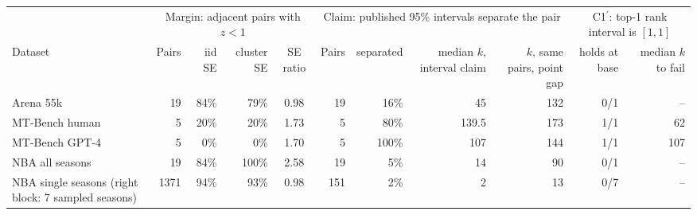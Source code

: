 \begin{tabular}{lrrrcrrrrrr}
\toprule
 & \multicolumn{4}{c}{Margin: adjacent pairs with $z<1$} & \multicolumn{4}{c}{Claim: published 95\% intervals separate the pair} & \multicolumn{2}{c}{C1$^\prime$: top-1 rank interval is $[1,1]$} \\
\cmidrule(lr){2-5}\cmidrule(lr){6-9}\cmidrule(lr){10-11}
Dataset & Pairs & iid SE & cluster SE & SE ratio & Pairs & separated & median $k$, interval claim & $k$, same pairs, point gap & holds at base & median $k$ to fail \\
\midrule
Arena 55k & 19 & 84\% & 79\% & 0.98 & 19 & 16\% & 45 & 132 & 0/1 & -- \\
MT-Bench human & 5 & 20\% & 20\% & 1.73 & 5 & 80\% & 139.5 & 173 & 1/1 & 62 \\
MT-Bench GPT-4 & 5 & 0\% & 0\% & 1.70 & 5 & 100\% & 107 & 144 & 1/1 & 107 \\
NBA all seasons & 19 & 84\% & 100\% & 2.58 & 19 & 5\% & 14 & 90 & 0/1 & -- \\
NBA single seasons (right block: 7 sampled seasons) & 1371 & 94\% & 93\% & 0.98 & 151 & 2\% & 2 & 13 & 0/7 & -- \\
\bottomrule
\end{tabular}
